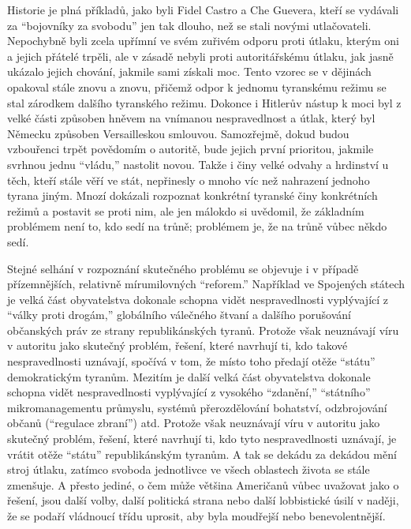\documentclass{book}
\begin{document}
Historie je plná příkladů, jako byli Fidel Castro a Che Guevera, kteří se vydávali za \enquote{bojovníky za svobodu} jen tak dlouho, než se stali novými utlačovateli. Nepochybně byli zcela upřímní ve svém zuřivém odporu proti útlaku, kterým oni a jejich přátelé trpěli, ale v zásadě nebyli proti autoritářskému útlaku, jak jasně ukázalo jejich chování, jakmile sami získali moc. Tento vzorec se v dějinách opakoval stále znovu a znovu, přičemž odpor k jednomu tyranskému režimu se stal zárodkem dalšího tyranského režimu. Dokonce i Hitlerův nástup k moci byl z velké části způsoben hněvem na vnímanou nespravedlnost a útlak, který byl Německu způsoben Versailleskou smlouvou. Samozřejmě, dokud budou vzbouřenci trpět povědomím o autoritě, bude jejich první prioritou, jakmile svrhnou jednu \enquote{vládu,} nastolit novou. Takže i činy velké odvahy a hrdinství u těch, kteří stále věří ve stát, nepřinesly o mnoho víc než nahrazení jednoho tyrana jiným. Mnozí dokázali rozpoznat konkrétní tyranské činy konkrétních režimů a postavit se proti nim, ale jen málokdo si uvědomil, že základním problémem není to, kdo sedí na trůně; problémem je, že na trůně vůbec někdo sedí.

Stejné selhání v rozpoznání skutečného problému se objevuje i v případě přízemnějších, relativně mírumilovných \enquote{reforem.} Například ve Spojených státech je velká část obyvatelstva dokonale schopna vidět nespravedlnosti vyplývající z \enquote{války proti drogám,} globálního válečného štvaní a dalšího porušování občanských práv ze strany republikánských tyranů. Protože však neuznávají víru v autoritu jako skutečný problém, řešení, které navrhují ti, kdo takové nespravedlnosti uznávají, spočívá v tom, že místo toho předají otěže \enquote{státu} demokratickým tyranům. Mezitím je další velká část obyvatelstva dokonale schopna vidět nespravedlnosti vyplývající z vysokého \enquote{zdanění,} \enquote{státního} mikromanagementu průmyslu, systémů přerozdělování bohatství, odzbrojování občanů (\enquote{regulace zbraní}) atd. Protože však neuznávají víru v autoritu jako skutečný problém, řešení, které navrhují ti, kdo tyto nespravedlnosti uznávají, je vrátit otěže \enquote{státu} republikánským tyranům. A tak se dekádu za dekádou mění stroj útlaku, zatímco svoboda jednotlivce ve všech oblastech života se stále zmenšuje. A přesto jediné, o čem může většina Američanů vůbec uvažovat jako o řešení, jsou další volby, další politická strana nebo další lobbistické úsilí v naději, že se podaří vládnoucí třídu uprosit, aby byla moudřejší nebo benevolentnější.
\end{document}
